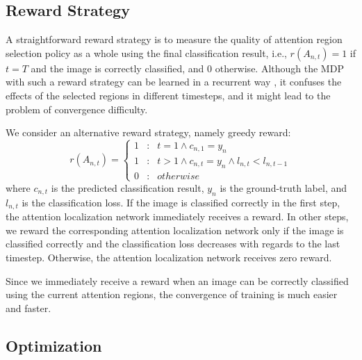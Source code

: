 \documentclass[runningheads]{llncs}
\begin{document}
\subsection{Reward Strategy}
A straightforward reward strategy is to measure the quality of attention region selection policy as a whole using the final classification result,
i.e., $r(A_{n,t}) = 1$  if $t = T$ and the image is correctly classified, and 0 otherwise.
Although the MDP with such a reward strategy can be learned in a recurrent way \cite{bd1}, it confuses the effects of the selected regions in different timesteps,
and it might lead to the problem of convergence difficulty.

We consider an alternative reward strategy, namely greedy reward:
\begin{equation}
r(A_{n,t})=\left\{\begin{array}{ccc} 1 & : & t = 1 \wedge c_{n,1} = y_{n} \\ 1 &:& t > 1 \wedge c_{n,t} = y_{n} \wedge l_{n,t} < l_{n,t-1} \\ 0&:& otherwise   \end{array}\right.
\end{equation}
where $c_{n,t}$ is the predicted classification result, $y_{n}$ is the ground-truth label, and $l_{n,t}$ is the classification loss. If the image is classified correctly in the first step, the attention localization network immediately receives a reward. In other steps, we reward the corresponding attention localization network only if the image is classified correctly and the classification loss decreases with regards to the last timestep.
Otherwise, the attention localization network receives zero reward.

Since we immediately receive a reward when an image can be correctly classified using the current attention regions, the convergence of training is much easier and faster.

\subsection{Optimization}
\end{document}
